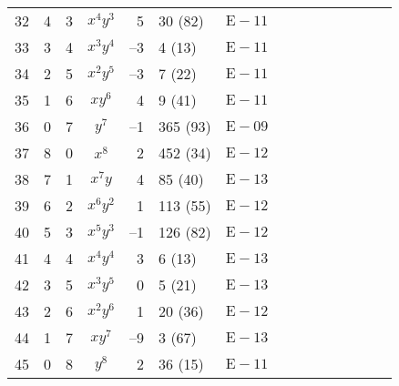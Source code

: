 \begin{table}[htbp]
\begin{center}
\begin{tabular}{rrrcr@{.}lc|rrrcr@{.}lcr}
32 & 4 & 3 & $x^{4}y^{3}$ & 5 & 30 (82) & $ \mathrm{E}-11 $ \\
33 & 3 & 4 & $x^{3}y^{4}$ & --3 & 4 (13) & $ \mathrm{E}-11 $ \\
34 & 2 & 5 & $x^{2}y^{5}$ & --3 & 7 (22) & $ \mathrm{E}-11 $ \\
35 & 1 & 6 & $xy^{6}$ & 4 & 9 (41) & $ \mathrm{E}-11 $ \\
36 & 0 & 7 & $y^{7}$ & --1 & 365 (93) & $ \mathrm{E}-09 $ \\[5pt]
37 & 8 & 0 & $x^{8}$ & 2 & 452 (34) & $ \mathrm{E}-12 $ \\
38 & 7 & 1 & $x^{7}y$ & 4 & 85 (40) & $ \mathrm{E}-13 $ \\
39 & 6 & 2 & $x^{6}y^{2}$ & 1 & 113 (55) & $ \mathrm{E}-12 $ \\
40 & 5 & 3 & $x^{5}y^{3}$ & --1 & 126 (82) & $ \mathrm{E}-12 $ \\
41 & 4 & 4 & $x^{4}y^{4}$ & 3 & 6 (13) & $ \mathrm{E}-13 $ \\
42 & 3 & 5 & $x^{3}y^{5}$ & 0 & 5 (21) & $ \mathrm{E}-13 $ \\
43 & 2 & 6 & $x^{2}y^{6}$ & 1 & 20 (36) & $ \mathrm{E}-12 $ \\
44 & 1 & 7 & $xy^{7}$ & --9 & 3 (67) & $ \mathrm{E}-13 $ \\
45 & 0 & 8 & $y^{8}$ & 2 & 36 (15) & $ \mathrm{E}-11 $ \\[5pt]
\end{tabular}
\end{center}
\label{tab:coeffs emis HeB I}
\end{table}

\endinput %
